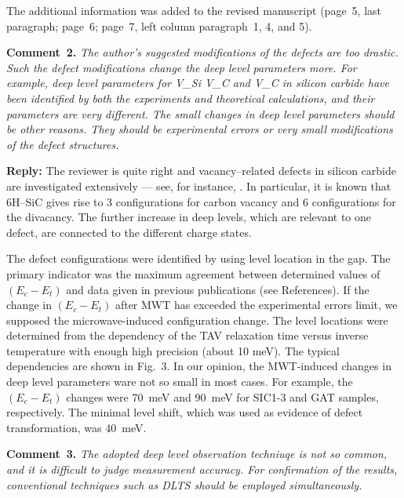 \documentclass[10pt]{iopart}
\begin{document}
The additional information was added to the revised manuscript
(page~5, last paragraph; page~6; page~7, left column paragraph~1, 4, and 5).


\vspace{1cm}
\noindent
\textcolor[rgb]{0.00,0.50,1.00}{\textbf{Comment~2.}}
\emph{The author's suggested modifications of the defects are too drastic.
Such the defect modifications change the deep level parameters more.
For example, deep level parameters for V\_Si V\_C and V\_C in silicon carbide have been
identified by both the experiments and theoretical calculations,
and their parameters are very different.
The small changes in deep level parameters should be other reasons.
They should be experimental errors or very small modifications of the defect structures.}

\noindent
\textcolor[rgb]{0.51,0.00,0.00}{\textbf{Reply:}}
The reviewer is quite right and vacancy--related defects in silicon carbide are investigated extensively ---
see, for instance, \cite{6HSiC:Vsi,4HSiC:Vc,6HSiC:VV2019,4HSiC:Vacan,SiC:defEPR,6HSiC:VPAS,4HSiC:VV,SiC:bookCh6,
6HSiC:Vsi2021,6HSiC:vac2021,4HSiC:NV,SiC:NV}.
In particular, it is known \cite{6HSiC:VV2019} that
6H--SiC gives rise to 3 configurations for carbon vacancy
and 6 configurations for the divacancy.
The further increase in deep levels, which are relevant to one defect, are connected to the different charge states.

The defect configurations were identified by using level location in the gap.
The primary indicator was the maximum agreement between determined values of $(E_c-E_t)$ and data given in
previous publications (see References).
If the change in $(E_c-E_t)$ after MWT has exceeded the experimental errors limit,
we supposed the microwave-induced configuration change.
The level locations were determined from the dependency of the TAV relaxation time
versus inverse temperature with enough high precision  (about 10 meV).
The typical dependencies are shown in Fig.~3.
In our opinion, the MWT-induced changes in deep level parameters ware not so small in most cases.
For example, the $(E_c-E_t)$ changes were 70~meV and 90~meV for SIC1-3 and GAT samples, respectively.
The minimal level shift, which was used as evidence of defect transformation, was 40~meV.





\vspace{1cm}
\noindent
\textcolor[rgb]{0.00,0.50,1.00}{\textbf{Comment~3.}}
\emph{The adopted deep level observation techniuqe is not so common,
and it is difficult to judge measurement accuracy.
For confirmation of the results, conventional techniques such as DLTS should be employed simultaneously.}
\end{document}
